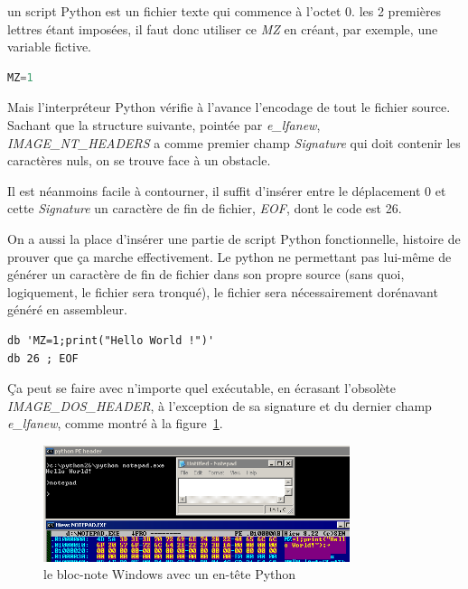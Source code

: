 un script Python est un fichier texte qui commence à l'octet 0. les 2 premières lettres étant imposées, il faut donc utiliser ce {\em MZ} en créant, par exemple, une variable fictive.
\begin{lstlisting}[language={Python},caption={un script python commençant par MZ},label={lst:albertini:pythonMZ}]
MZ=1
\end{lstlisting}

Mais l'interpréteur Python vérifie à l'avance l'encodage de tout le fichier source. Sachant que la structure suivante, pointée par {\em e\_lfanew}, {\em IMAGE\_NT\_HEADERS} a comme premier champ {\em Signature} qui doit contenir les caractères nuls, on se trouve face à un obstacle.

Il est néanmoins facile à contourner, il suffit d'insérer entre le déplacement 0 et cette {\em Signature} un caractère de fin de fichier, {\em EOF}, dont le code est 26.

On a aussi la place d'insérer une partie de script Python fonctionnelle, histoire de prouver que ça marche effectivement.
Le python ne permettant pas lui-même de générer un caractère de fin de fichier dans son propre source (sans quoi, logiquement, le fichier sera tronqué), le fichier sera nécessairement dorénavant généré en assembleur.
\begin{lstlisting}[language={},caption={un script python généré en assembleur},label={lst:albertini:pythonasm}]
db 'MZ=1;print("Hello World !")'
db 26 ; EOF
\end{lstlisting}

Ça peut se faire avec n'importe quel exécutable, en écrasant l'obsolète {\em IMAGE\_DOS\_HEADER}, à l'exception de sa signature et du dernier champ {\em e\_lfanew}, comme montré à la figure~\ref{fig:albertini:pythonnotepad}.
\begin{figure}[ht]
  \centering
  \includegraphics[width=0.8\textwidth]{albertini/img/pythonnotepad}
  \caption{le bloc-note Windows avec un en-tête Python}
  \label{fig:albertini:pythonnotepad}
\end{figure}


